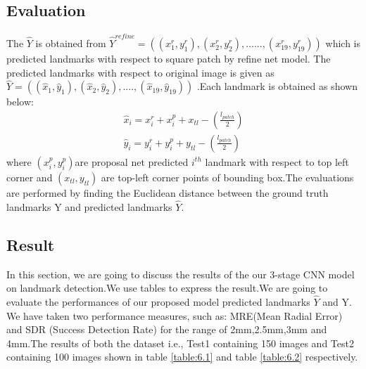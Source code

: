 \documentclass[sn-mathphys]{sn-jnl}%
\theoremstyle{thmstyleone}%
\theoremstyle{thmstyletwo}%
\theoremstyle{thmstylethree}%
\begin{document}
\subsection{Evaluation}
The \begin{math} \hat{Y} \end{math} is obtained from \begin{math} \hat{Y}^{refine}= ((x^{r}_{1},y^{r}_{1}) , (x^{r}_{2},y^{r}_{2}),...... ,(x^{r}_{19},y^{r}_{19})) \end{math} which is predicted landmarks with respect to square patch by refine net model. The predicted landmarks with respect to original image is given as \begin{math}
\hat{Y} = ((\hat{x}_{1},\hat{y}_{1}),(\hat{x}_{2},\hat{y}_{2}),....,(\hat{x}_{19},\hat{y}_{19}))\end{math} .Each landmark is obtained as shown below:
\begin{align*}
\hat{x}_{i} = x^{r}_{i} + x^{p}_{i} + x_{tl} - (\frac{l_{patch}}{2})\\
\hat{y}_{i} = y^{r}_{i} + y^{p}_{i} + y_{tl} - (\frac{l_{patch}}{2})
\end{align*}
where \begin{math} (x^{p}_{i},y^{p}_{i})  \end{math}are proposal net predicted \begin{math} i^{th} \end{math} landmark with respect to top left corner and  \begin{math}(x_{tl},y_{tl}) \end{math} are top-left corner points of bounding box.The evaluations are performed by finding the Euclidean distance between the ground truth landmarks Y and predicted landmarks \begin{math} \hat{Y} \end{math}.
 
 \subsection{Result}
 In this section, we are going to discuss the results of the our 3-stage CNN model on landmark detection.We use tables to
express the result.We are going to evaluate the performances of our proposed model predicted landmarks \begin{math}
\hat{Y} \end{math} and Y. We have taken two performance measures, such as: MRE(Mean Radial Error) and SDR (Success Detection Rate) for the range of 2mm,2.5mm,3mm and 4mm.The results of both the dataset i.e., Test1 containing 150 images and Test2 containing 100 images shown in table \ref{table:6.1} and table \ref{table:6.2} respectively.
 
\end{document}
